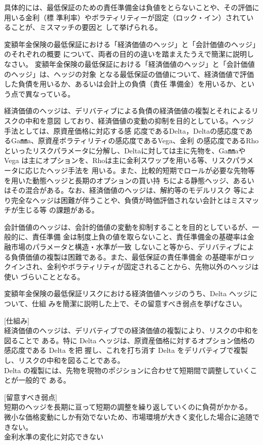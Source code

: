 \documentclass[report,gutter=10mm,fore-edge=10mm,uplatex,dvipdfmx]{jlreq}
\begin{document}
具体的には、最低保証のための責任準備金は負値をとらないことや、その評価に用いる金利（標
準利率）やボラティリティーが固定（ロック・イン）されていることが、ミスマッチの要因と
して挙げられる。

変額年金保険の最低保証における「経済価値のヘッジ」と「会計価値のヘッジ」のそれぞれの概要
について、両者の目的の違いを踏まえたうえで簡潔に説明しなさい。
\answer{}
変額年金保険の最低保証における「経済価値のヘッジ」と「会計価値のヘッジ」は、ヘッジの対象
となる最低保証の価値について、経済価値で評価した負債を用いるか、あるいは会計上の負債（責任
準備金）を用いるか、という点で異なっている。

経済価値のヘッジは、デリバティブによる負債の経済価値の複製とそれによるリスクの中和を意図
しており、経済価値の変動の抑制を目的としている。ヘッジ手法としては、原資産価格に対応する感
応度であるDelta，Deltaの感応度であるGa㎜a、原資産ボラティリティの感応度であるVega、金利
の感応度であるRhoといったリスクパラメータに分解し、Deltaに対しては主に先物を、Ga㎜aやVega
は主にオプションを、Rhoは主に金利スワップを用いる等、リスクパラメータに応じたヘッジ手法を
用いる。また、比較的短期でロールが必要な先物等を用いた動態ヘッジと長期のオプションの買い持
ちによる静態ヘッジ、あるいはその混合がある。なお、経済価値のヘッジは、解約等のモデルリスク
等により完全なヘッジは困難が伴うことや、負債が時価評価されない会計とはミスマッチが生じる等
の課題がある。

会計価値のヘッジは、会計的価値の変動を抑制することを目的としているが、一般的に、責任準備
金は制度上負の値を取らないこと、責任準備金の基礎率は金融市場のパラメータと構造・水準が一致
しないこと等から、デリバティブによる負債価値の複製は困難である。また、最低保証の責任準備金
の基礎率がロックインされ、金利やボラティリティが固定されることから、先物以外のヘッジは使い
づらいこととなる。

変額年金保険の最低保証リスクにおける経済価値ヘッジのうち、Delta ヘッジについて、仕組
みを簡潔に説明した上で、その留意すべき弱点を挙げなさい。
\answer{}

[仕組み]\\
経済価値のヘッジは、デリバティブでの経済価値の複製により、リスクの中和を図ることで
ある。特に Delta ヘッジは、原資産価格に対するオプション価格の感応度である Delta を把
握し、これを打ち消す Delta をデリバティブで複製し、リスクの中和を図ることである。\\
Delta の複製には、先物を現物のポジションに合わせて短期間で調整していくことが一般的で
ある。

[留意すべき弱点]\\
短期のヘッジを長期に亘って短期の調整を繰り返していくのに負荷がかかる。\\
微小な価格変動にしか有効でないため、市場環境が大きく変化した場合に追随できない。\\
金利水準の変化に対応できない
\end{document}
